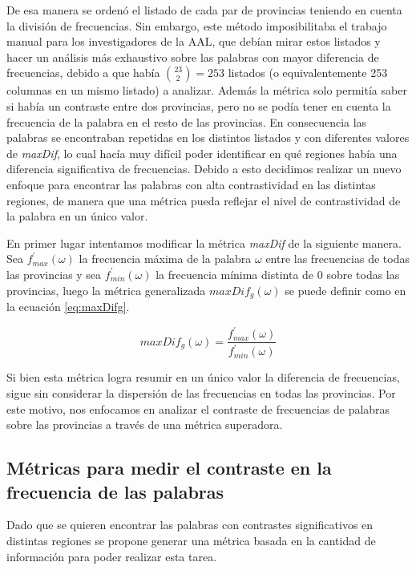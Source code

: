 De esa manera se ordenó el listado de cada par de provincias teniendo en cuenta la división de frecuencias. 
Sin embargo, este método imposibilitaba el trabajo manual para los investigadores de la AAL, que debían mirar estos listados y hacer un análisis más exhaustivo sobre las palabras con mayor diferencia de frecuencias, debido a que había $\binom{23}{2} = 253$
listados (o equivalentemente 253 columnas en un mismo listado) a analizar. Además la métrica solo permitía saber si había un contraste entre dos provincias, pero no se podía tener en cuenta la frecuencia de la palabra en el resto de las provincias. 
En consecuencia las palabras se encontraban repetidas en los distintos listados y con diferentes valores de \textit{maxDif}, lo cual hacía muy difícil poder identificar en qué regiones había una diferencia significativa de frecuencias.
Debido a esto decidimos realizar un nuevo enfoque para encontrar las palabras con alta contrastividad en las distintas regiones, de manera que una métrica pueda reflejar el nivel de contrastividad de la palabra en un único valor. 

En primer lugar intentamos modificar la métrica \textit{maxDif} de la siguiente manera. 
Sea $f_{max}^\prime(\omega)$ la frecuencia máxima de la palabra $\omega$ entre las frecuencias de todas las provincias y sea $f_{min}^\prime(\omega)$ la frecuencia mínima distinta de $0$ sobre todas las provincias, luego la métrica generalizada \textit{$maxDif_g(\omega)$} se puede definir como en la ecuación \ref{eq:maxDifg}.

\begin{equation}
 maxDif_g(\omega) = \frac{f_{max}^\prime(\omega)}{f_{min}^\prime(\omega)}
 \label{eq:maxDifg}  
\end{equation} 

Si bien esta métrica logra resumir en un único valor la diferencia de frecuencias, sigue sin considerar la dispersión de las frecuencias en todas las provincias.
Por este motivo, nos enfocamos en analizar el contraste de frecuencias de palabras sobre las provincias a través de una métrica superadora.

\subsection{Métricas para medir el contraste en la frecuencia de las palabras}
Dado que se quieren encontrar las palabras con contrastes significativos en distintas 
regiones se propone generar una métrica basada en la cantidad de información 
para poder realizar esta tarea.


